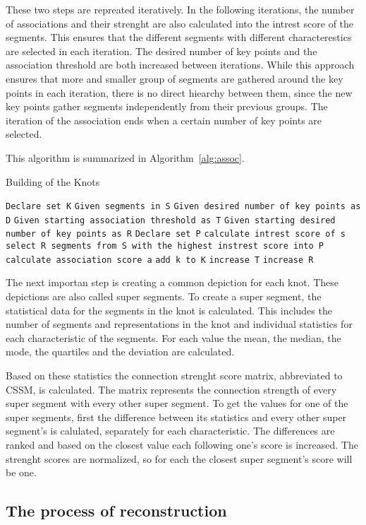 These two steps are repreated iteratively. In the following iterations, the number of associations and their strenght are also calculated into the intrest score of the segments. This ensures that the different segments with different characterestics are selected in each iteration. The desired number of key points and the association threshold are both increased between iterations. While this approach ensures that more and smaller group of segments are gathered around the key points in each iteration, there is no direct hiearchy between them, since the new key points gather segments independently from their previous groups. The iteration of the association ends when a certain number of key points are selected.

This algorithm is summarized in Algorithm~\ref{alg:assoc}.

\begin{algorithm}
\caption{Building of the Knots}\label{alg:assoc}
\begin{algorithmic}
\State \texttt{Declare set K}
\State \texttt{Given segments in S}
\State \texttt{Given desired number of key points as D}
\State \texttt{Given starting association threshold as T}
\State \texttt{Given starting desired number of key points as R}
    \State \texttt{Declare set P}
        \State \texttt{calculate intrest score of s}
    \EndFor
    \State \texttt{select R segments from S with the highest instrest score into P}
            \State \texttt{calculate association score a}
            \EndIf
        \EndFor
        \State \texttt{add k to K}
    \EndFor
    \State \texttt{increase T}
    \State \texttt{increase R}
\EndWhile
\end{algorithmic}
\end{algorithm}

The next importan step is creating a common depiction for each knot. These depictions are also called super segments. To create a super segment, the statistical data for the segments in the knot is calculated. This includes the number of segments and representations in the knot and individual statistics for each characteristic of the segments. For each value the mean, the median, the mode, the quartiles and the deviation are calculated.

Based on these statistics the connection strenght score matrix, abbreviated to CSSM, is calculated. The matrix represents the connection strength of every super segment with every other super segment. To get the values for one of the super segments, first the difference between its statistics and every other super segment's is calulated, separately for each characteristic. The differences are ranked and based on the closest value each following one's score is increased. The strenght scores are normalized, so for each the closest super segment's score will be one.

\subsection{The process of reconstruction} %


